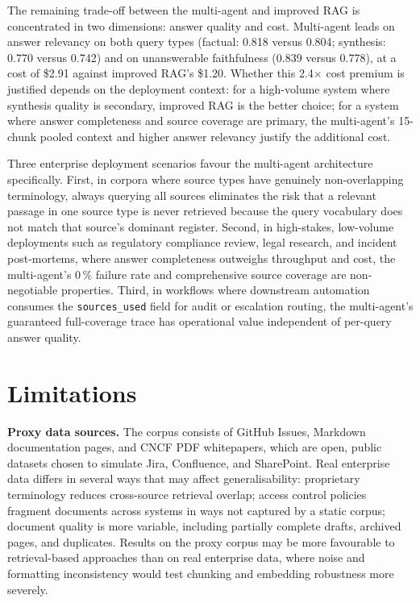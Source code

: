The remaining trade-off between the multi-agent and improved RAG is concentrated in two dimensions: answer quality and cost. Multi-agent leads on answer relevancy on both query types (factual: 0.818 versus 0.804; synthesis: 0.770 versus 0.742) and on unanswerable faithfulness (0.839 versus 0.778), at a cost of \$2.91 against improved RAG's \$1.20. Whether this 2.4$\times$ cost premium is justified depends on the deployment context: for a high-volume system where synthesis quality is secondary, improved RAG is the better choice; for a system where answer completeness and source coverage are primary, the multi-agent's 15-chunk pooled context and higher answer relevancy justify the additional cost.

Three enterprise deployment scenarios favour the multi-agent architecture specifically. First, in corpora where source types have genuinely non-overlapping terminology, always querying all sources eliminates the risk that a relevant passage in one source type is never retrieved because the query vocabulary does not match that source's dominant register. Second, in high-stakes, low-volume deployments such as regulatory compliance review, legal research, and incident post-mortems, where answer completeness outweighs throughput and cost, the multi-agent's 0\,\% failure rate and comprehensive source coverage are non-negotiable properties. Third, in workflows where downstream automation consumes the \texttt{sources\_used} field for audit or escalation routing, the multi-agent's guaranteed full-coverage trace has operational value independent of per-query answer quality.


\section{Limitations}
\label{sec:limitations}

\textbf{Proxy data sources.} The corpus consists of GitHub Issues, Markdown documentation pages, and CNCF PDF whitepapers, which are open, public datasets chosen to simulate Jira, Confluence, and SharePoint. Real enterprise data differs in several ways that may affect generalisability: proprietary terminology reduces cross-source retrieval overlap; access control policies fragment documents across systems in ways not captured by a static corpus; document quality is more variable, including partially complete drafts, archived pages, and duplicates. Results on the proxy corpus may be more favourable to retrieval-based approaches than on real enterprise data, where noise and formatting inconsistency would test chunking and embedding robustness more severely.

